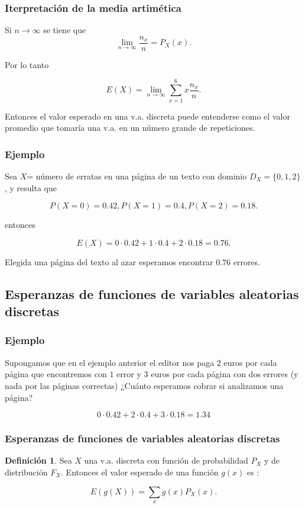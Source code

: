 \documentclass[handout]{beamer}\usepackage[]{graphicx}\usepackage[]{color}
\renewcommand{\emph}[1]{{\color{red}#1}}
\theoremstyle{plain}
\theoremstyle{definition}
\newtheorem{definicion}{Definición}
\begin{document}
\begin{frame}
\frametitle{Iterpretación de la media artimética}

Si $n\to \infty$ se tiene que  
$$\lim_{n\to \infty} \frac{n_{x}}{n}=P_{X}(x).$$

Por lo tanto

$$E(X)=\displaystyle \lim_{n\to\infty}\sum_{x=1}^{6}x \frac{n_{x}}{n}.$$

Entonces el valor esperado en una v.a. discreta puede entenderse como el valor promedio que
tomaría una v.a. en un número grande de repeticiones.
\end{frame}


\begin{frame}

\frametitle{Ejemplo}
    Sea $X$= número  de erratas en una página de un texto con dominio $D_X=\{0,1,2\}$, y resulta que

    $$P(X=0)=0.42, P(X=1)=0.4, P(X=2)=0.18.$$
    
    entonces
    
    $$E(X)=0\cdot 0.42+ 1\cdot 0.4 + 2 \cdot 0.18=0.76.$$

    Elegida una página del texto al azar esperamos encontrar $0.76$
    errores.

\end{frame}


\subsection{Esperanzas de funciones de variables aleatorias discretas}

\begin{frame}
\frametitle{Ejemplo}
Supongamos que en el ejemplo anterior el editor nos paga $2$ euros por cada página que
encontremos con $1$ error y $3$ euros por cada página con  dos errores (y nada por las
páginas correctas) ¿Cuánto esperamos cobrar si analizamos una página?

$$0\cdot 0.42 + 2\cdot 0.4 + 3\cdot 0.18=1.34$$
\end{frame}

\begin{frame}
\frametitle{Esperanzas de funciones de variables aleatorias discretas}
\begin{definicion}
Sea $X$ una v.a. discreta con función de probabilidad $P_{X}$ y de distribución
$F_{X}$. Entonces el \emph{valor esperado de una función} $g(x)$ es :

$$E(g(X))=\sum_{x}g(x) P_{X}(x).$$
\end{definicion}
\end{frame}
\end{document}
